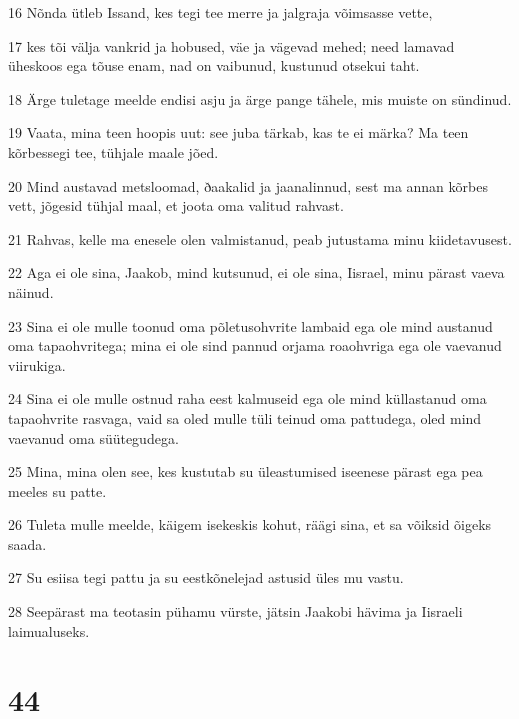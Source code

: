 \par 16 Nõnda ütleb Issand, kes tegi tee merre ja jalgraja võimsasse vette,
\par 17 kes tõi välja vankrid ja hobused, väe ja vägevad mehed; need lamavad üheskoos ega tõuse enam, nad on vaibunud, kustunud otsekui taht.
\par 18 Ärge tuletage meelde endisi asju ja ärge pange tähele, mis muiste on sündinud.
\par 19 Vaata, mina teen hoopis uut: see juba tärkab, kas te ei märka? Ma teen kõrbessegi tee, tühjale maale jõed.
\par 20 Mind austavad metsloomad, ðaakalid ja jaanalinnud, sest ma annan kõrbes vett, jõgesid tühjal maal, et joota oma valitud rahvast.
\par 21 Rahvas, kelle ma enesele olen valmistanud, peab jutustama minu kiidetavusest.
\par 22 Aga ei ole sina, Jaakob, mind kutsunud, ei ole sina, Iisrael, minu pärast vaeva näinud.
\par 23 Sina ei ole mulle toonud oma põletusohvrite lambaid ega ole mind austanud oma tapaohvritega; mina ei ole sind pannud orjama roaohvriga ega ole vaevanud viirukiga.
\par 24 Sina ei ole mulle ostnud raha eest kalmuseid ega ole mind küllastanud oma tapaohvrite rasvaga, vaid sa oled mulle tüli teinud oma pattudega, oled mind vaevanud oma süütegudega.
\par 25 Mina, mina olen see, kes kustutab su üleastumised iseenese pärast ega pea meeles su patte.
\par 26 Tuleta mulle meelde, käigem isekeskis kohut, räägi sina, et sa võiksid õigeks saada.
\par 27 Su esiisa tegi pattu ja su eestkõnelejad astusid üles mu vastu.
\par 28 Seepärast ma teotasin pühamu vürste, jätsin Jaakobi hävima ja Iisraeli laimualuseks.

\chapter{44}

